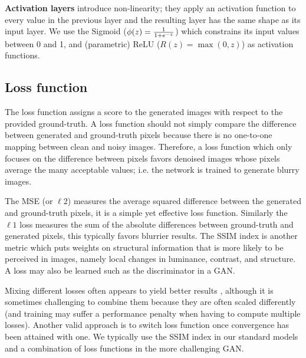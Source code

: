 \textbf{Activation layers} introduce non-linearity; they apply an activation function to every value in the previous layer and the resulting layer has the same shape as its input layer. We use the Sigmoid ($\phi(z)={1\over{1+e^{-z}}}$) which constrains its input values between 0 and 1, and (parametric) \ac{ReLU} ($R(z)=\max(0,z)$) as activation functions. 


\subsection{Loss function}
The loss function assigns a score to the generated images with respect to the provided ground-truth. A loss function should not simply compare the difference between generated and ground-truth pixels because there is no one-to-one mapping between clean and noisy images. Therefore, a loss function which only focuses on the difference between pixels favors denoised images whose pixels average the many acceptable values; i.e. the network is trained to generate blurry images. \cite{pix2pix}

The \ac{MSE} (or $\ell 2$) measures the average squared difference between the generated and ground-truth pixels, it is a simple yet effective loss function. Similarly the $\ell 1$ loss measures the sum of the absolute differences between ground-truth and generated pixels, this typically favors blurrier results. The \ac{SSIM} index is another metric which puts weights on structural information that is more likely to be perceived in images, namely local changes in luminance, contrast, and structure. A loss may also be learned such as the discriminator in a \ac{GAN}.

Mixing different losses often appears to yield better results \cite{lossescomp}, although it is sometimes challenging to combine them because they are often scaled differently (and training may suffer a performance penalty when having to compute multiple losses). Another valid approach is to switch loss function once convergence has been attained with one. \cite{lossescomp} We typically use the \ac{SSIM} index in our standard models and a combination of loss functions in the more challenging \ac{GAN}.


